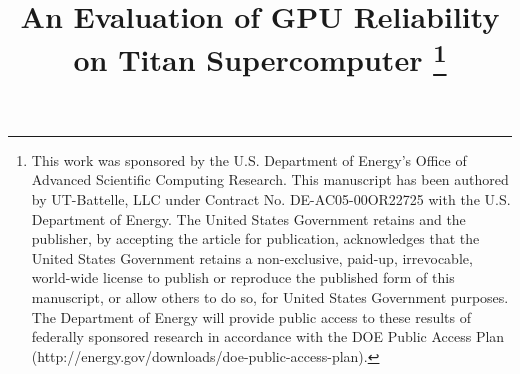 \documentclass[conference]{IEEEtran}
\begin{document}
\title{An Evaluation of GPU Reliability on Titan Supercomputer%
\thanks{This work was sponsored by the U.S. Department of Energy's Office of
Advanced Scientific Computing Research. This manuscript has been authored by
UT-Battelle, LLC under Contract No. DE-AC05-00OR22725 with the U.S. Department
of Energy. The United States Government retains and the publisher, by accepting
the article for publication, acknowledges that the United States Government
retains a non-exclusive, paid-up, irrevocable, world-wide license to publish or
reproduce the published form of this manuscript, or allow others to do so, for
United States Government purposes. The Department of Energy will provide public
access to these results of federally sponsored research in accordance with the
DOE Public Access Plan (http://energy.gov/downloads/doe-public-access-plan).}
}

\author{%
\and
{}
\and
{}
\and
{}
\and
{}
}
\end{document}
